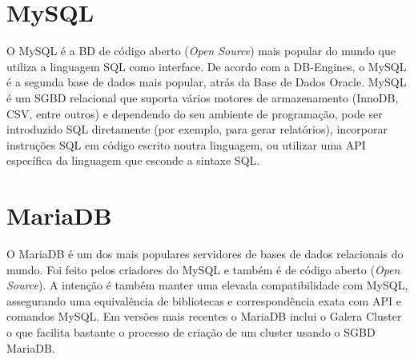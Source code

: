 \section{MySQL}
O MySQL é a \ac{BD} de código aberto (\textit{Open Source}) mais popular do mundo que utiliza a linguagem \ac{SQL} como interface. De acordo com a DB-Engines, o MySQL é a segunda base de dados mais popular, atrás da Base de Dados Oracle.
MySQL é um \ac{SGBD} relacional que suporta vários motores de armazenamento (InnoDB, \ac{CSV}, entre outros) e dependendo do seu ambiente de programação, pode ser introduzido SQL diretamente (por exemplo, para gerar relatórios), incorporar instruções \ac{SQL} em código escrito noutra linguagem, ou utilizar uma \ac{API} específica da linguagem que esconde a sintaxe \ac{SQL}.

\section{MariaDB}
O MariaDB é um dos mais populares servidores de bases de dados relacionais do mundo. Foi feito pelos criadores do MySQL e também é de código aberto (\textit{Open Source}). A intenção é também manter uma elevada compatibilidade com MySQL, assegurando uma equivalência de bibliotecas e correspondência exata com \ac{API} e comandos MySQL.
Em versões mais recentes o MariaDB inclui o Galera Cluster o que facilita bastante o processo de criação de um cluster usando o \ac{SGBD} MariaDB.